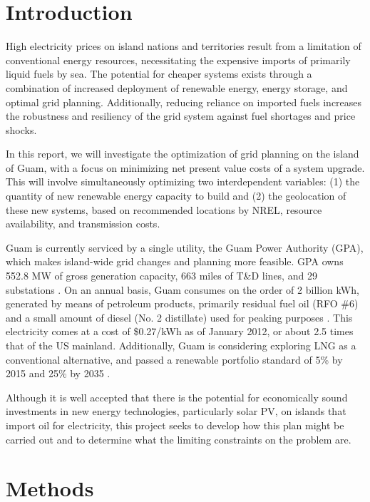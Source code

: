 \documentclass[12pt,letterpaper,fleqn]{article}
\begin{document}


\section{Introduction}

High electricity prices on island nations and territories result from
a limitation of conventional energy resources, necessitating the
expensive imports of primarily liquid fuels by sea. The potential for
cheaper systems exists through a combination of increased deployment
of renewable energy, energy storage, and optimal grid
planning. Additionally, reducing reliance on imported fuels increases
the robustness and resiliency of the grid system against fuel
shortages and price shocks.

In this report, we will investigate the optimization of grid planning
on the island of Guam, with a focus on minimizing net present value
costs of a system upgrade. This will involve simultaneously optimizing
two interdependent variables: (1) the quantity of new renewable energy
capacity to build and (2) the geolocation of these new systems, based
on recommended locations by NREL, resource availability, and
transmission costs.

Guam is currently serviced by a single utility, the Guam Power
Authority (GPA), which makes island-wide grid changes and planning
more feasible. GPA owns 552.8 MW of gross generation capacity, 663
miles of T\&D lines, and 29 substations \cite{gpa14a}. On an annual
basis, Guam consumes on the order of 2 billion kWh, generated by means
of petroleum products, primarily residual fuel oil (RFO \#6) and a
small amount of diesel (No. 2 distillate) used for peaking purposes
\cite{gpa14a, eia12}. This electricity comes at a cost of \$0.27/kWh
as of January 2012, or about 2.5 times that of the US
mainland. Additionally, Guam is considering exploring LNG as a
conventional alternative, and passed a renewable portfolio standard of
5\% by 2015 and 25\% by 2035 \cite{eia12}.

Although it is well accepted that there is the potential for
economically sound investments in new energy technologies,
particularly solar PV, on islands that import oil for electricity,
this project seeks to develop how this plan might be carried out and
to determine what the limiting constraints on the problem are.

\section{Methods}
\end{document}
